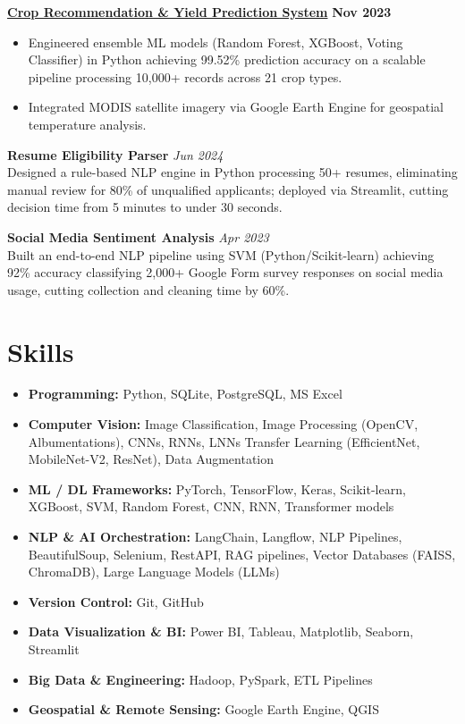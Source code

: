 \documentclass[9.5pt,letterpaper]{article}
\newcommand{\resumeItem}[1]{\item \small{#1}}
\newcommand{\resumeProject}[2]{
  \textbf{#1} \hfill \textbf{\small #2} \\[-1pt]
}
\begin{document}
\resumeProject{\href{https://github.com/bhavika-bit/CROP-RECOMMENDATION-AND-YIELD-PREDICTION}{Crop Recommendation \& Yield Prediction System}}{Nov 2023}
\begin{itemize}
    \resumeItem{Engineered ensemble ML models (Random Forest, XGBoost, Voting Classifier) in Python achieving 99.52\% prediction accuracy on a scalable pipeline processing 10,000+ records across 21 crop types.}
    \resumeItem{Integrated MODIS satellite imagery via Google Earth Engine for geospatial temperature analysis.}
\end{itemize}

\textbf{Resume Eligibility Parser} \hfill \textit{\small Jun 2024}\\
{\small Designed a rule-based NLP engine in Python processing 50+ resumes, eliminating manual review for 80\% of unqualified applicants; deployed via Streamlit, cutting decision time from 5 minutes to under 30 seconds.}

\vspace{2pt}
\textbf{Social Media Sentiment Analysis} \hfill \textit{\small Apr 2023}\\
{\small Built an end-to-end NLP pipeline using SVM (Python/Scikit-learn) achieving 92\% accuracy classifying 2,000+ Google Form survey responses on social media usage, cutting collection and cleaning time by 60\%.}

\vspace{-6pt}
\section{Skills}
\small
\begin{itemize}[leftmargin=15pt, topsep=0pt, itemsep=0pt, parsep=0pt]
    \item \textbf{Programming:} Python, SQLite, PostgreSQL, MS Excel
    \item \textbf{Computer Vision:} Image Classification, Image Processing (OpenCV, Albumentations), CNNs, RNNs, LNNs Transfer Learning
(EfficientNet, MobileNet-V2, ResNet), Data Augmentation
    \item \textbf{ML / DL Frameworks:} PyTorch, TensorFlow, Keras, Scikit-learn, XGBoost, SVM, Random Forest, CNN, RNN, Transformer models
    \item \textbf{NLP \& AI Orchestration:} LangChain, Langflow, NLP Pipelines, BeautifulSoup, Selenium, RestAPI, RAG pipelines, Vector Databases (FAISS, ChromaDB), Large Language Models (LLMs)
    \item \textbf{Version Control:} Git, GitHub
    \item \textbf{Data Visualization \& BI:} Power BI, Tableau, Matplotlib, Seaborn, Streamlit
    \item \textbf{Big Data \& Engineering:} Hadoop, PySpark, ETL Pipelines
    \item \textbf{Geospatial \& Remote Sensing:} Google Earth Engine, QGIS
\end{itemize}
\end{document}
